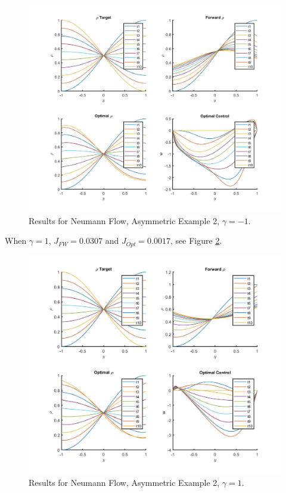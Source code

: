 \documentclass[11pt, a4paper]{article}
\theoremstyle{definition}
\begin{document}
\begin{figure}[h]
	\includegraphics[scale=0.3]{Resn14.jpg}
	\caption{Results for Neumann Flow, Asymmetric Example 2, $\gamma = -1$.}
	\label{Resn14}
\end{figure}
When $\gamma = 1$, $J_{FW} = 0.0307$ and $J_{Opt} = 0.0017$, see Figure \ref{Res14}.
\begin{figure}[h]
	\includegraphics[scale=0.3]{Res14.jpg}
	\caption{Results for Neumann Flow, Asymmetric Example 2, $\gamma = 1$.}
	\label{Res14}
\end{figure}
\end{document}
